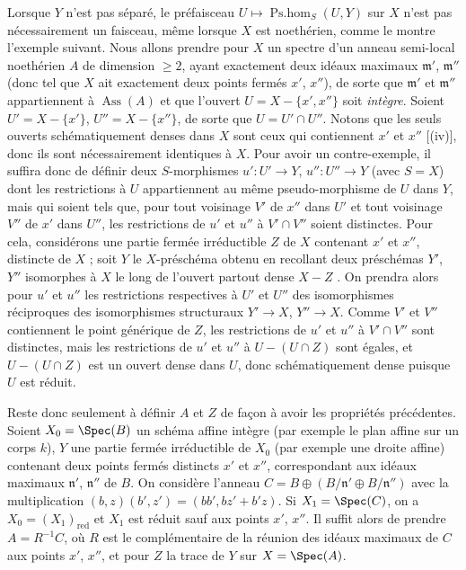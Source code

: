 \begin{remark}[20.2.16]
\label{IV.20.2.16}
Lorsque $Y$ n'est pas séparé, le préfaisceau $U\mapsto\operatorname{Ps.hom}_S(U,Y)$ sur $X$ n'est pas nécessairement un faisceau, même lorsque $X$ est noethérien, comme le montre l'exemple suivant.
Nous allons prendre pour $X$ un spectre d'un anneau semi-local noethérien $A$ de dimension $\geq2$, ayant exactement deux idéaux
maximaux $\mathfrak{m}'$, $\mathfrak{m}''$ (donc tel que $X$ ait exactement deux points fermés $x'$, $x''$), de sorte que $\mathfrak{m}'$ et $\mathfrak{m}''$ appartiennent à $\operatorname{Ass}(A)$ et que l'ouvert $U=X-\{x',x''\}$ soit \emph{intègre}.
Soient $U'=X-\{x'\}$, $U''=X-\{x''\}$, de sorte que $U=U'\cap U''$.
Notons que les seuls ouverts schématiquement denses dans $X$ sont ceux qui contiennent $x'$ et $x''$ [(iv)], donc ils sont nécessairement identiques à $X$.
Pour avoir un contre-exemple, il suffira donc de définir deux $S$-morphismes $u':U'\to Y$, $u'':U''\to Y$ (avec $S=X$) dont les restrictions à $U$ appartiennent au même pseudo-morphisme de $U$ dans $Y$, mais qui soient tels que, pour tout voisinage $V'$ de $x''$ dans $U'$ et tout voisinage $V''$ de $x'$ dans $U''$, les restrictions de $u'$ et $u''$ à $V'\cap V''$ soient distinctes.
Pour cela, considérons une partie fermée irréductible $Z$ de $X$ contenant $x'$ et $x''$, distincte de $X$ ; soit $Y$ le $X$-préschéma obtenu en recollant deux préschémas $Y'$, $Y''$ isomorphes à $X$ le long de l'ouvert partout dense $X-Z$ .
On prendra alors pour $u'$ et $u''$ les restrictions respectives à $U'$ et $U''$ des isomorphismes réciproques des isomorphismes structuraux $Y'\to X$, $Y''\to X$.
Comme $V'$ et $V''$ contiennent le point générique de $Z$, les restrictions de $u'$ et $u''$ à $V'\cap V''$ sont distinctes, mais les restrictions de $u'$ et $u''$ à $U-(U\cap Z)$ sont égales, et $U-(U\cap Z)$ est un ouvert dense dans $U$, donc schématiquement dense puisque $U$ est réduit.

Reste donc seulement à définir $A$ et $Z$ de façon à avoir les propriétés précédentes.
Soient $X_0=\Spec(B)$ un schéma affine intègre (par exemple le plan affine sur un corps $k$), $Y$ une partie fermée irréductible de $X_0$ (par exemple une droite affine) contenant deux points fermés distincts $x'$ et $x''$, correspondant aux idéaux maximaux $\mathfrak{n}'$, $\mathfrak{n}''$ de $B$.
On considère l'anneau $C=B\oplus(B/\mathfrak{n}'\oplus B/\mathfrak{n}'')$ avec la multiplication $(b,z)(b',z')=(bb',bz'+b'z)$.
Si $X_1=\Spec(C)$, on a $X_0=(X_1)_\mathrm{red}$ et $X_1$ est réduit sauf aux points $x'$, $x''$.
Il suffit alors de prendre $A=R^{-1}C$, où $R$ est le complémentaire de la réunion des idéaux maximaux de $C$ aux points $x'$, $x''$, et pour $Z$ la trace de $Y$ sur $X=\Spec(A)$.
\end{remark}

